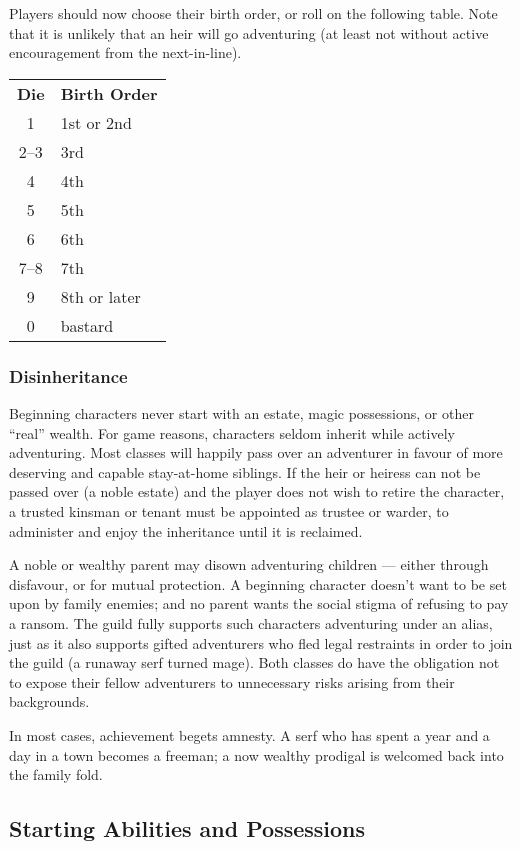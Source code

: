 \begin{multicols*}{3}
Players should now choose their birth order, or roll on the following
table. Note that it is unlikely that an heir will go adventuring (at
least not without active encouragement from the next-in-line).

\begin{tabular}{cl}
\textbf{Die} & \textbf{Birth Order} \\
1	& 1st or 2nd \\
2--3	& 3rd \\
4	& 4th \\
5	& 5th \\
6	& 6th \\
7--8	& 7th \\
9	& 8th or later \\
0	& bastard \\
\end{tabular}

\subsubsection{Disinheritance}

Beginning characters never start with an estate, magic possessions, or
other ``real'' wealth.  For game reasons, characters seldom inherit
while actively adventuring. Most classes will happily pass over an
adventurer in favour of more deserving and capable stay-at-home
siblings.  If the heir or heiress can not be passed over (\eg a noble
estate) and the player does not wish to retire the character, a
trusted kinsman or tenant must be appointed as trustee or warder, to
administer and enjoy the inheritance until it is reclaimed.

A noble or wealthy parent may disown adventuring children --- either
through disfavour, or for mutual protection.  A beginning character
doesn't want to be set upon by family enemies; and no parent wants the
social stigma of refusing to pay a ransom. The guild fully supports
such characters adventuring under an alias, just as it also supports
gifted adventurers who fled legal restraints in order to join the
guild (\eg a runaway serf turned mage).  Both classes do have the
obligation not to expose their fellow adventurers to unnecessary risks
arising from their backgrounds.

In most cases, achievement begets amnesty.  A serf who has spent a
year and a day in a town becomes a freeman; a now wealthy prodigal is
welcomed back into the family fold.

\subsection{Starting Abilities and Possessions}
\label{chargen:abilities}


\end{multicols*}
